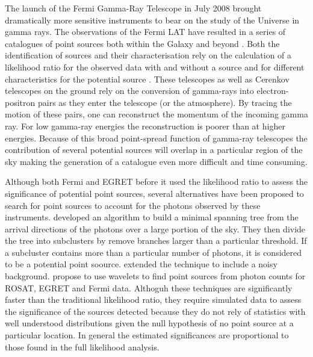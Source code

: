 \documentclass[useAMS,usenatbib]{mn2e}
\begin{document}
The launch of the Fermi Gamma-Ray Telescope in July 2008 brought
dramatically more sensitive instruments to bear on the study of the
Universe in gamma rays.  The observations of the Fermi LAT
\citep[e.g.][]{2012ApJS..203....4A} have resulted in a series of
catalogues of point sources both within the Galaxy and beyond
\citep[e.g.][]{2010ApJS..188..405A,2011ApJ...743..171A,
  2012ApJS..199...31N,2013ApJS..208...17A,
  2013ApJS..209...34A,2015ApJS..218...23A}.  Both the identification
of sources and their characterisation rely on the calculation of a
likelihood ratio for the observed data with and without a source and
for different characteristics for the potential source
\citep{1979ApJ...228..939C,1992MNRAS.259..413S,1996ApJ...461..396M}.
These telescopes as well as Cerenkov telescopes on the ground rely on
the conversion of gamma-rays into electron-positron pairs as they
enter the telescope (or the atmosphere).  By tracing the motion of
these pairs, one can reconstruct the momentum of the incoming gamma
ray.  For low gamma-ray energies the reconstruction is poorer than at
higher energies.  Because of this broad point-spread
function of gamma-ray telescopes the contribution of several potential
sources will overlap in a particular region of the sky making the
generation of a catalogue even more difficult and time consuming.

Although both Fermi and EGRET before it used the likelihood ratio to
assess the significance of potential point sources, several
alternatives have been proposed to search for point sources to account
for the photons observed by these instruments.
\citet{2009arXiv0912.3843M,2008MNRAS.383.1166C} developed an algorithm
to build a minimal spanning tree from the arrival directions of the
photons over a large portion of the sky.  They then divide the tree
into subclusters by remove branches larger than a particular
threshold.  If a subcluster contains more than a particular number of
photons, it is considered to be a potential point soource.
\citet{2013Ap&SS.347..169C} extended the technique to include a noisy
background.
\citet{1997ApJ...483..350D,1997ApJ...483..370D,2007AIPC..921..546C}
propose to use wavelets to find point sources from photon counts for
ROSAT, EGRET and Fermi data.  Althoguh these techniques are
significantly faster than the traditional likelihood ratio, they
require simulated data to assess the significance of the sources
detected because they do not rely of statistics with well understood
distributions given the null hypothesis of no point source at a
particular location.  In general the estimated significances are
proportional to those found in the full likelihood analysis.
\end{document}
